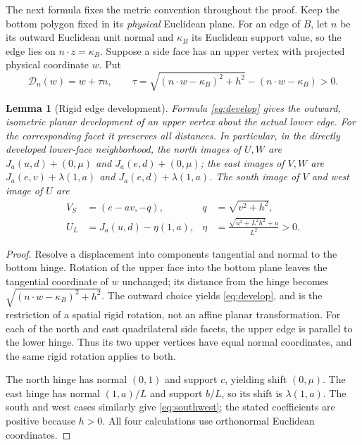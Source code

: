 \documentclass[a4paper,11pt]{amsart}
\newtheorem{lemma}[theorem]{Lemma}
\begin{document}
The next formula fixes the metric convention throughout the proof. Keep the bottom polygon fixed in its \emph{physical} Euclidean plane. For an edge of $B$, let $n$ be its outward Euclidean unit normal and $\kappa_B$ its Euclidean support value, so the edge lies on $n\cdot z=\kappa_B$. Suppose a side face has an upper vertex with projected physical coordinate $w$. Put
\begin{equation}\label{eq:develop}
 \mathcal D_{n}(w)=w+\tau n,\qquad
 \tau=\sqrt{(n\cdot w-\kappa_B)^2+h^2}
             -(n\cdot w-\kappa_B)>0.
\end{equation}

\begin{lemma}[Rigid edge development]\label{lem:rigid}
Formula \eqref{eq:develop} gives the outward, isometric planar development of an upper vertex about the actual lower edge. For the corresponding facet it preserves all distances. In particular, in the directly developed lower-face neighborhood, the north images of $U,W$ are $J_a(u,d)+(0,\mu)$ and $J_a(e,d)+(0,\mu)$; the east images of $V,W$ are $J_a(e,v)+\lambda(1,a)$ and $J_a(e,d)+\lambda(1,a)$. The south image of $V$ and west image of $U$ are
\begin{equation}\label{eq:southwest}
\begin{aligned}
 V_S&=(e-av,-q), & q&=\sqrt{v^2+h^2},\\
 U_L&=J_a(u,d)-\eta(1,a),&
 \eta&=\frac{\sqrt{u^2+L^2h^2}+u}{L^2}>0.
\end{aligned}
\end{equation}
\end{lemma}
\begin{proof}
Resolve a displacement into components tangential and normal to the bottom hinge. Rotation of the upper face into the bottom plane leaves the tangential coordinate of $w$ unchanged; its distance from the hinge becomes $\sqrt{(n\cdot w-\kappa_B)^2+h^2}$. The outward choice yields \eqref{eq:develop}, and is the restriction of a spatial rigid rotation, not an affine planar transformation. For each of the north and east quadrilateral side facets, the upper edge is parallel to the lower hinge. Thus its two upper vertices have equal normal coordinates, and the same rigid rotation applies to both.

The north hinge has normal $(0,1)$ and support $c$, yielding shift $(0,\mu)$. The east hinge has normal $(1,a)/L$ and support $b/L$, so its shift is $\lambda(1,a)$. The south and west cases similarly give \eqref{eq:southwest}; the stated coefficients are positive because $h>0$. All four calculations use orthonormal Euclidean coordinates.
\end{proof}
\end{document}
